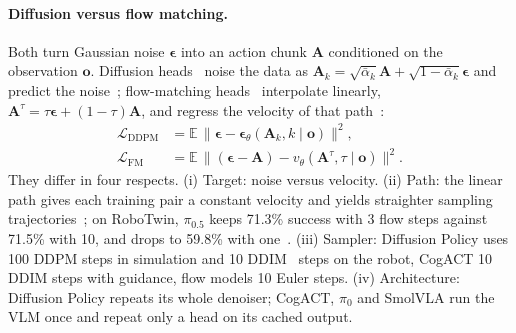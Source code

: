 \paragraph{Diffusion versus flow matching.}
Both turn Gaussian noise $\boldsymbol\epsilon$ into an action chunk $\mathbf A$ conditioned on the observation $\mathbf o$.
Diffusion heads~\cite{chi2025diffusion,li2024cogact} noise the data as $\mathbf A_k=\sqrt{\bar\alpha_k}\mathbf A+\sqrt{1-\bar\alpha_k}\boldsymbol\epsilon$ and predict the noise~\cite{ho2020denoising}; flow-matching heads~\cite{black2024pi_0,shukor2025smolvla} interpolate linearly, $\mathbf A^\tau=\tau\boldsymbol\epsilon+(1-\tau)\mathbf A$, and regress the velocity of that path~\cite{lipman2022flow}:
\begin{align}
\mathcal L_\text{DDPM}&=\mathbb E\,\big\|\boldsymbol\epsilon-\boldsymbol\epsilon_\theta(\mathbf A_k,k\mid\mathbf o)\big\|^2,\\
\mathcal L_\text{FM}&=\mathbb E\,\big\|(\boldsymbol\epsilon-\mathbf A)-v_\theta(\mathbf A^\tau,\tau\mid\mathbf o)\big\|^2 .
\label{eq:fm}
\end{align}
They differ in four respects.
(i) Target: noise versus velocity.
(ii) Path: the linear path gives each training pair a constant velocity and yields straighter sampling trajectories~\cite{lipman2022flow}; on RoboTwin, $\pi_{0.5}$ keeps 71.3\% success with 3 flow steps against 71.5\% with 10, and drops to 59.8\% with one~\cite{tang2026fewer}.
(iii) Sampler: Diffusion Policy uses 100 DDPM steps in simulation and 10 DDIM~\cite{song2020denoising} steps on the robot, CogACT 10 DDIM steps with guidance, flow models 10 Euler steps.
(iv) Architecture: Diffusion Policy repeats its whole denoiser; CogACT, $\pi_0$ and SmolVLA run the VLM once and repeat only a head on its cached output.
